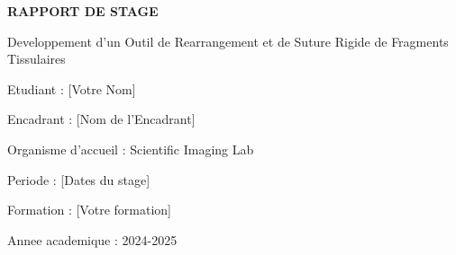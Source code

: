 \documentclass[12pt,a4paper]{article}
\begin{document}
\begin{titlepage}
\centering

\vspace*{2cm}

{\LARGE \textbf{RAPPORT DE STAGE}}

\vspace{1cm}

{\Large Developpement d'un Outil de Rearrangement et de Suture Rigide de Fragments Tissulaires}

\vspace{2cm}

{\large Etudiant : [Votre Nom]}

\vspace{0.5cm}

{\large Encadrant : [Nom de l'Encadrant]}

\vspace{0.5cm}

{\large Organisme d'accueil : Scientific Imaging Lab}

\vspace{0.5cm}

{\large Periode : [Dates du stage]}

\vspace{0.5cm}

{\large Formation : [Votre formation]}

\vspace{0.5cm}

{\large Annee academique : 2024-2025}

\vfill

\end{titlepage}
\end{document}
